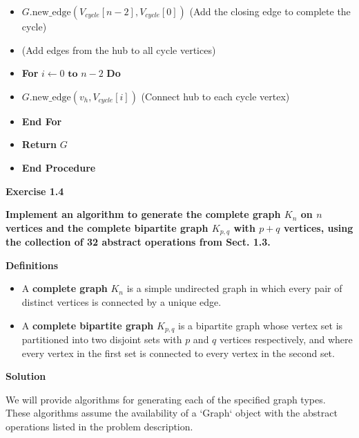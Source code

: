 \documentclass{article}
\begin{document}
\begin{itemize}
\begin{itemize}
        \item \hspace{0.5cm} $G.\text{new\_edge}(V_{cycle}[n-2], V_{cycle}[0])$ (Add the closing edge to complete the cycle)
        \item \hspace{0.5cm} (Add edges from the hub to all cycle vertices)
        \item \hspace{0.5cm} \textbf{For} $i \gets 0 \textbf{ to } n-2$ \textbf{Do}
        \item \hspace{1cm} $G.\text{new\_edge}(v_h, V_{cycle}[i])$ (Connect hub to each cycle vertex)
        \item \hspace{0.5cm} \textbf{End For}
        \item \hspace{0.5cm} \textbf{Return} $G$
        \item \textbf{End Procedure}
    \end{itemize}
\end{itemize}

\textbf{Exercise 1.4}

\textbf{Implement an algorithm to generate the complete graph $K_n$ on $n$ vertices and the complete bipartite graph $K_{p,q}$ with $p + q$ vertices, using the collection of 32 abstract operations from Sect. 1.3.}

\textbf{Definitions}

\begin{itemize}
    \item A \textbf{complete graph} $K_n$ is a simple undirected graph in which every pair of distinct vertices is connected by a unique edge.
    \item A \textbf{complete bipartite graph} $K_{p,q}$ is a bipartite graph whose vertex set is partitioned into two disjoint sets with $p$ and $q$ vertices respectively, and where every vertex in the first set is connected to every vertex in the second set.
\end{itemize}

\textbf{Solution}

We will provide algorithms for generating each of the specified graph types. These algorithms assume the availability of a `Graph` object with the abstract operations listed in the problem description.
\end{document}
